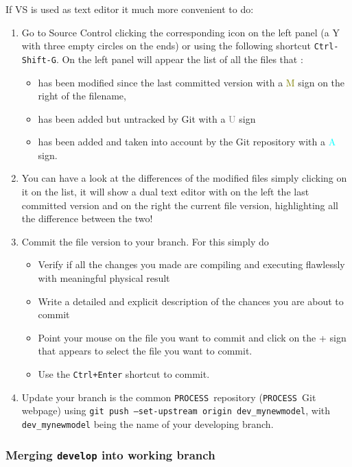 \documentclass[11pt,a4paper]{report}
\newcommand{\process}{\mbox{\texttt{PROCESS}}}
\begin{document}
If VS is used as text editor it much more convenient to do:
\begin{enumerate}
	\item Go to Source Control clicking the corresponding icon on the left panel (a Y with three empty circles on the ends) or using the following shortcut \texttt{Ctrl-Shift-G}. 
	On the left panel will appear the list of all the files that :
	\begin{itemize}
		\item has been modified since the last committed version with a \textcolor{olive}{M} sign on the right of the filename,
		\item has been added but untracked by Git with a \textcolor{gray}{U} sign
		\item has been added and taken into account by the Git repository with a \textcolor{cyan}{A} sign.
	\end{itemize}
	
	\item You can have a look at the differences of the modified files simply clicking on it on the list, it will show a dual text editor with on the left the last committed version and on the right the current file version, highlighting all the difference between the two!
	
	\item Commit the file version to your branch. For this simply do
	\begin{itemize}
		\item Verify if all the changes you made are compiling and executing flawlessly with meaningful physical result
		\item Write a detailed and explicit description of the chances you are about to commit
		\item Point your mouse on the file you want to commit and click on the + sign that appears to select the file you want to commit.
		\item Use the \texttt{Ctrl+Enter} shortcut to commit.
	\end{itemize}
	
	\item Update your branch is the common \process\ repository (\process\ Git webpage) using \texttt{git push --set-upstream origin dev\_mynewmodel}, with \texttt{dev\_mynewmodel} being the name of your developing branch.
\end{enumerate}



\subsubsection{Merging \texttt{develop} into working branch}
\end{document}
